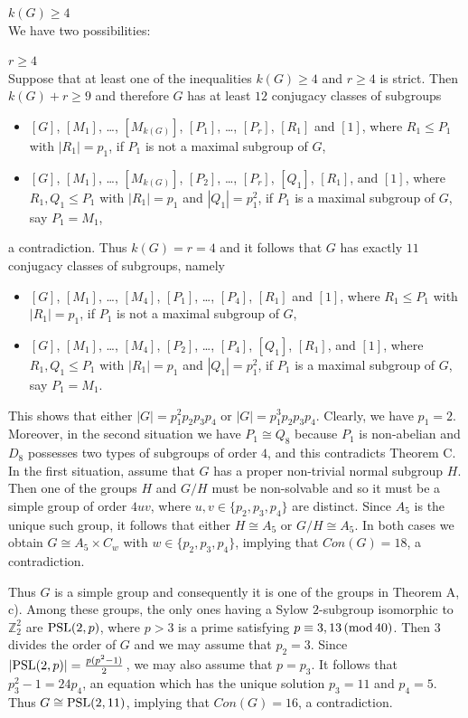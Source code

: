 \documentclass[12pt]{article}
\newcommand{\0}{{\leqno}}
\begin{document}
\hspace{5mm}{\bf Case 1.} $k(G)\geq 4$\\
We have two possibilities:

\medskip

\hspace{10mm}{\bf Subcase 1.1.} $r\geq 4$\\ 
Suppose that at least one of the inequalities $k(G)\geq 4$ and $r\geq 4$ is strict. Then $k(G)+r\geq 9$ and therefore $G$ has at least $12$ conjugacy classes of subgroups
\begin{itemize}
\item[-] $[G]$, $[M_1]$, \dots, $[M_{k(G)}]$, $[P_1]$, \dots, $[P_r]$, $[R_1]$ and $[1]$, where $R_1\leq P_1$ with $|R_1|=p_1$, if $P_1$ is not a maximal subgroup of $G$,
\item[-] $[G]$, $[M_1]$, \dots, $[M_{k(G)}]$, $[P_2]$, \dots, $[P_r]$, $[Q_1]$, $[R_1]$, and $[1]$, where $R_1,Q_1\leq P_1$ with $|R_1|=p_1$ and $|Q_1|=p_1^2$, if $P_1$ is a maximal subgroup of $G$, say $P_1=M_1$,
\end{itemize}a contradiction. Thus $k(G)=r=4$ and it follows that $G$ has exactly $11$ conjugacy classes of subgroups, namely
\begin{itemize}
\item[-] $[G]$, $[M_1]$, \dots, $[M_4]$, $[P_1]$, \dots, $[P_4]$, $[R_1]$ and $[1]$, where $R_1\leq P_1$ with $|R_1|=p_1$, if $P_1$ is not a maximal subgroup of $G$,
\item[-] $[G]$, $[M_1]$, \dots, $[M_4]$, $[P_2]$, \dots, $[P_4]$, $[Q_1]$, $[R_1]$, and $[1]$, where $R_1,Q_1\leq P_1$ with $|R_1|=p_1$ and $|Q_1|=p_1^2$, if $P_1$ is a maximal subgroup of $G$, say $P_1=M_1$.
\end{itemize}This shows that either $|G|=p_1^2p_2p_3p_4$ or $|G|=p_1^3p_2p_3p_4$. Clearly, we have $p_1=2$. Moreover, in the second situation we have $P_1\cong Q_8$ because $P_1$ is non-abelian and $D_8$ possesses two types of subgroups of order $4$, and this contradicts Theorem C. In the first situation, assume that $G$ has a proper non-trivial normal subgroup $H$. Then one of the groups $H$ and $G/H$ must be non-solvable and so it must be a simple group of order $4uv$, where $u,v\in\{p_2,p_3,p_4\}$ are distinct. Since $A_5$ is the unique such group, it follows that either $H\cong A_5$ or $G/H\cong A_5$. In both cases we obtain $G\cong A_5\times C_w$ with $w\in\{p_2,p_3,p_4\}$, implying that $Con(G)=18$, a contradiction. 

Thus $G$ is a simple group and consequently it is one of the groups in Theorem A, c). Among these groups, the only ones having a Sylow $2$-subgroup isomorphic to $\mathbb{Z}_2^2$ are ${\rm PSL}(2,p)$, where $p>3$ is a prime sa\-tis\-fy\-ing $p\equiv 3, 13\, ({\rm mod}\, 40)$. Then $3$ divides the order of $G$ and we may assume that $p_2=3$. Since $|{\rm PSL}(2,p)|=\frac{p(p^2-1)}{2}$\,, we may also assume that $p=p_3$. It follows that $p_3^2-1=24p_4$, an equation which has the unique solution $p_3=11$ and $p_4=5$. Thus $G\cong{\rm PSL}(2,11)$, implying that $Con(G)=16$, a contradiction.
\end{document}

